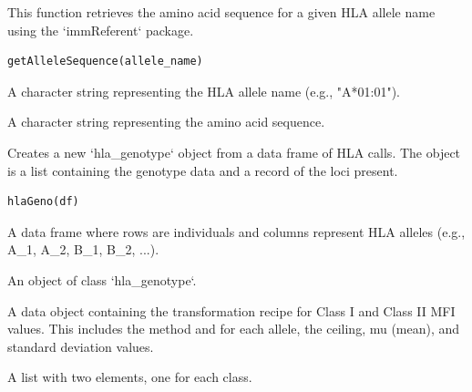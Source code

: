 \documentclass[letterpaper]{book}
\begin{document}
%
\begin{Description}
This function retrieves the amino acid sequence for a given HLA allele
name using the `immReferent` package.
\end{Description}
%
\begin{Usage}
\begin{verbatim}
getAlleleSequence(allele_name)
\end{verbatim}
\end{Usage}
%
\begin{Arguments}
\begin{ldescription}
\item[\code{allele\_name}] A character string representing the HLA allele name
(e.g., "A*01:01").
\end{ldescription}
\end{Arguments}
%
\begin{Value}
A character string representing the amino acid sequence.
\end{Value}
%
\begin{Description}
Creates a new `hla\_genotype` object from a data frame of HLA calls. The
object is a list containing the genotype data and a record of the loci
present.
\end{Description}
%
\begin{Usage}
\begin{verbatim}
hlaGeno(df)
\end{verbatim}
\end{Usage}
%
\begin{Arguments}
\begin{ldescription}
\item[\code{df}] A data frame where rows are individuals and columns represent
HLA alleles (e.g., A\_1, A\_2, B\_1, B\_2, ...).
\end{ldescription}
\end{Arguments}
%
\begin{Value}
An object of class `hla\_genotype`.
\end{Value}
%
\begin{Description}
A data object containing the transformation recipe for Class I
and Class II MFI values. This includes the method and for each allele, the
ceiling, mu (mean), and standard deviation values.
\end{Description}
%
\begin{Format}
A list with two elements, one for each class.
\end{Format}
\end{document}
